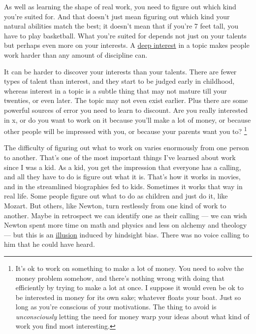 As well as learning the shape of real work, you need to figure out which
kind you're suited for. And that doesn't just mean figuring out which
kind your natural abilities match the best; it doesn't mean that if
you're 7 feet tall, you have to play basketball. What you're suited for
depends not just on your talents but perhaps even more on your
interests. A \href{genius.html}{deep interest} in a topic makes people
work harder than any amount of discipline can.

It can be harder to discover your interests than your talents. There are
fewer types of talent than interest, and they start to be judged early
in childhood, whereas interest in a topic is a subtle thing that may not
mature till your twenties, or even later. The topic may not even exist
earlier. Plus there are some powerful sources of error you need to learn
to discount. Are you really interested in x, or do you want to work on
it because you'll make a lot of money, or because other people will be
impressed with you, or because your parents want you to?
\footnote{It's ok to work on something to make a lot of money. You need to
solve the money problem somehow, and there's nothing wrong with doing
that efficiently by trying to make a lot at once. I suppose it would
even be ok to be interested in money for its own sake; whatever floats
your boat. Just so long as you're conscious of your motivations. The
thing to avoid is \emph{unconsciously} letting the need for money warp
your ideas about what kind of work you find most interesting.}

The difficulty of figuring out what to work on varies enormously from
one person to another. That's one of the most important things I've
learned about work since I was a kid. As a kid, you get the impression
that everyone has a calling, and all they have to do is figure out what
it is. That's how it works in movies, and in the streamlined biographies
fed to kids. Sometimes it works that way in real life. Some people
figure out what to do as children and just do it, like Mozart. But
others, like Newton, turn restlessly from one kind of work to another.
Maybe in retrospect we can identify one as their calling --- we can wish
Newton spent more time on math and physics and less on alchemy and
theology --- but this is an \href{disc.html}{illusion} induced by
hindsight bias. There was no voice calling to him that he could have
heard.

